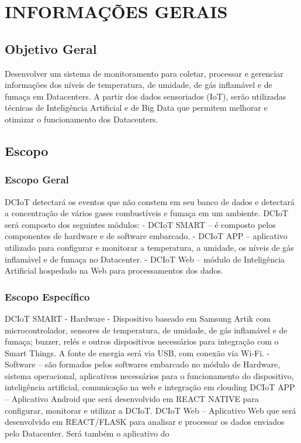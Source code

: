 \chapter{INFORMAÇÕES GERAIS}
\label{cap:informações gerais}

\section{Objetivo Geral}
Desenvolver um sistema de monitoramento para coletar, processar e gerenciar informações dos níveis de temperatura, de umidade, de gás inflamável e de fumaça em Datacenters. A partir dos dados sensoriados (IoT), serão utilizadas técnicas de Inteligência Artificial e de Big Data que permitem melhorar e otimizar o funcionamento dos Datacenters.



\section {Escopo}

\subsection {Escopo Geral}

DCIoT detectará os eventos que não constem em seu banco de dados e detectará a concentração de vários gases combustíveis e fumaça em um ambiente. DCIoT será composto dos seguintes módulos:
- DCIoT SMART – é composto pelos componentes de hardware e de software embarcado. 
- DCIoT APP – aplicativo utilizado para configurar e monitorar a temperatura, a umidade, os níveis de gás inflamável e de fumaça no Datacenter.
- DCIoT Web – módulo de Inteligência Artificial hospedado na Web para processamentos dos dados.

\subsection {Escopo Específico}

DCIoT SMART
- Hardware - Dispositivo baseado em Samsung Artik com microcontrolador, sensores de temperatura, de umidade, de gás inflamável e de fumaça; buzzer, relés e outros dispositivos necessários para integração com o Smart Things. A fonte de energia será via USB, com conexão via Wi-Fi.
- Software – são formados pelos softwares embarcado no módulo de Hardware, sistema operacional, aplicativos necessários para o funcionamento do dispositivo, inteligência artificial, comunicação na web e integração em clouding
DCIoT APP – Aplicativo Android que será desenvolvido em REACT NATIVE para configurar, monitorar e utilizar a DCIoT. 
DCIoT Web – Aplicativo Web que será desenvolvido em REACT/FLASK para analisar e processar os dados enviados pelo Datacenter. Será também o aplicativo do 


